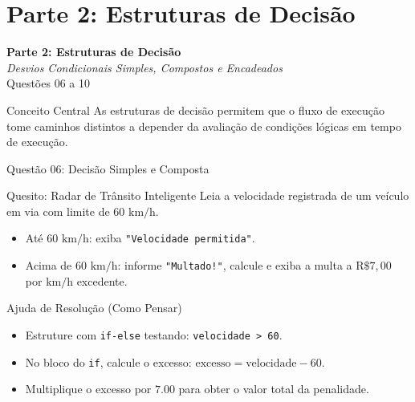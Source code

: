 \section{Parte 2: Estruturas de Decisão}

\begin{frame}
    \begin{center}
        \LARGE \textbf{Parte 2: Estruturas de Decisão}\\
        \vspace{0.3cm}
        \normalsize \textit{Desvios Condicionais Simples, Compostos e Encadeados}\\
        \vspace{0.4cm}
        \small Questões 06 a 10
    \end{center}
    \vspace{0.3cm}
    \begin{alertblock}{Conceito Central}
        As estruturas de decisão permitem que o fluxo de execução tome caminhos distintos a depender da avaliação de condições lógicas em tempo de execução.
    \end{alertblock}
\end{frame}

\begin{frame}{Questão 06: Decisão Simples e Composta}
    \begin{block}{Quesito: Radar de Trânsito Inteligente}
        Leia a velocidade registrada de um veículo em via com limite de $60\text{ km/h}$.
        \begin{itemize}
            \item Até $60\text{ km/h}$: exiba \texttt{"Velocidade permitida"}.
            \item Acima de $60\text{ km/h}$: informe \texttt{"Multado!"}, calcule e exiba a multa a $\text{R\$ } 7{,}00$ por $\text{km/h}$ excedente.
        \end{itemize}
    \end{block}

    \begin{exampleblock}{Ajuda de Resolução (Como Pensar)}
        \begin{itemize}
            \item Estruture com \texttt{if-else} testando: \texttt{velocidade > 60}.
            \item No bloco do \texttt{if}, calcule o excesso: $\text{excesso} = \text{velocidade} - 60$.
            \item Multiplique o excesso por $7.00$ para obter o valor total da penalidade.
        \end{itemize}
    \end{exampleblock}
\end{frame}

